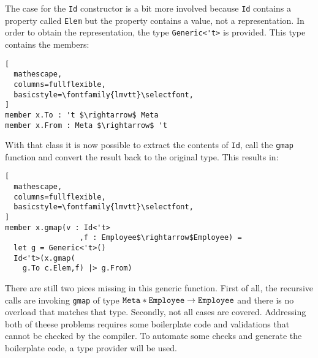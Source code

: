 \documentclass{sigplanconf}
\begin{document}
The case for the \verb+Id+ constructor is a bit more involved because
\verb+Id+ contains a property called \verb+Elem+ but the property
contains a value, not a representation. In order to obtain the
representation, the type \verb+Generic<'t>+ is provided. This type
contains the members:
\begin{lstlisting}[
  mathescape,
  columns=fullflexible,
  basicstyle=\fontfamily{lmvtt}\selectfont,
]
member x.To : 't $\rightarrow$ Meta
member x.From : Meta $\rightarrow$ 't
\end{lstlisting}
With that class it is now possible to extract the contents of
\verb+Id+, call the \verb+gmap+ function and convert the result back
to the original type. This results in:
\begin{lstlisting}[
  mathescape,
  columns=fullflexible,
  basicstyle=\fontfamily{lmvtt}\selectfont,
]
member x.gmap(v : Id<'t>
                 ,f : Employee$\rightarrow$Employee) =
  let g = Generic<'t>()
  Id<'t>(x.gmap(
    g.To c.Elem,f) |> g.From)
\end{lstlisting}
There are still two pices missing in this generic function. First of
all, the recursive calls are invoking \verb+gmap+ of type
$\mathtt{Meta}*\mathtt{Employee}\rightarrow\mathtt{Employee}$ and there is no
overload that matches that type. Secondly, not all cases are
covered. Addressing both of theese problems requires some boilerplate
code and validations that cannot be checked by the compiler. To
automate some checks and generate the boilerplate code, a type
provider will be used.
\end{document}
